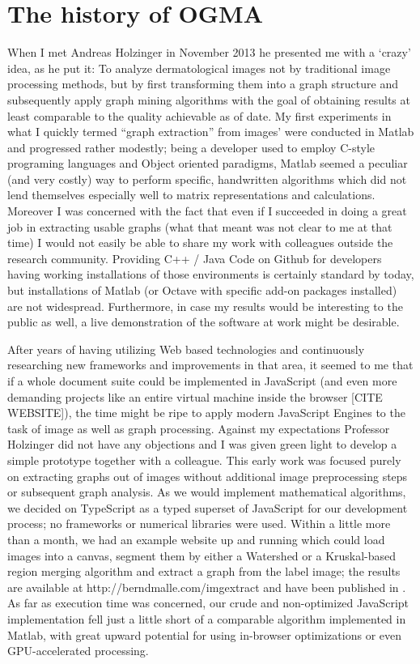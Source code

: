 \section{The history of OGMA}
\label{sect:ogma_history}
When I met Andreas Holzinger in November 2013 he presented me with a `crazy' idea, as he put it: To analyze dermatological images not by traditional image processing methods, but by first transforming them into a graph structure and subsequently apply graph mining algorithms with the goal of obtaining results at least comparable to the quality achievable as of date. My first experiments in what I quickly termed ``graph extraction'' from images' were conducted in Matlab and progressed rather modestly; being a developer used to employ C-style programing languages and Object oriented paradigms, Matlab seemed a peculiar (and very costly) way to perform specific, handwritten algorithms which did not lend themselves especially well to matrix representations and calculations. Moreover I was concerned with the fact that even if I succeeded in doing a great job in extracting usable graphs (what that meant was not clear to me at that time) I would not easily be able to share my work with colleagues outside the research community. Providing C++ / Java Code on Github for developers having working installations of those environments is certainly standard by today, but installations of Matlab (or Octave with specific add-on packages installed) are not widespread. Furthermore, in case my results would be interesting to the public as well, a live demonstration of the software at work might be desirable.

\par

After years of having utilizing Web based technologies and continuously researching new frameworks and improvements in that area, it seemed to me that if a whole document suite could be implemented in JavaScript (and even more demanding projects like an entire virtual machine inside the browser [CITE WEBSITE]), the time might be ripe to apply modern JavaScript Engines to the task of image as well as graph processing. Against my expectations Professor Holzinger did not have any objections and I was given green light to develop a simple prototype together with a colleague. This early work was focused purely on extracting graphs out of images without additional image preprocessing steps or subsequent graph analysis. As we would implement mathematical algorithms, we decided on TypeScript as a typed superset of JavaScript for our development process; no frameworks or numerical libraries were used. Within a little more than a month, we had an example website up and running which could load images into a canvas, segment them by either a Watershed or a Kruskal-based region merging algorithm and extract a graph from the label image; the results are available at http://berndmalle.com/imgextract and have been published in \cite{GraphExtractPaper}. As far as execution time was concerned, our crude and non-optimized JavaScript implementation fell just a little short of a comparable algorithm implemented in Matlab, with great upward potential for using in-browser optimizations or even GPU-accelerated processing.

